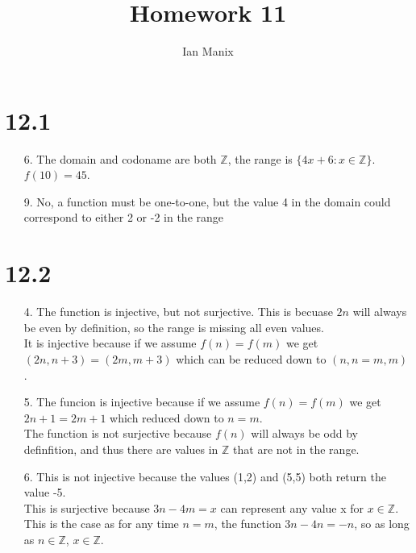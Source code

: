 \documentclass[sigconf]{article}
\title{
  \textbf{Homework 11} \\
  }
\author{ 
  Ian Manix
  }
\begin{document}



\maketitle




\section*{12.1}
\begin{itemize}
  \item[6.] The domain and codoname are both $\mathbb{Z}$, the range is $\{4x+6:x\in\mathbb{Z}\}$. $f(10)=45$.
  \item[9.] No, a function must be one-to-one, but the value 4 in the domain could correspond to either 2 or -2 in the range
\end{itemize}

\section*{12.2}
\begin{itemize}
  \item[4.] The function is injective, but not surjective. This is becuase $2n$ will always be even by definition, so the range is missing all even values.\\
            It is injective because if we assume $f(n)=f(m)$ we get $(2n,n+3)=(2m,m+3)$ which can be reduced down to $(n,n=m,m)$.
  \item[5.] The funcion is injective because if we assume $f(n)=f(m)$ we get $2n+1=2m+1$ which reduced down to $n=m$.\\
            The function is not surjective because $f(n)$ will always be odd by definfition, and thus there are values in $\mathbb{Z}$ that are not in the range.
  \item[6.] This is not injective because the values (1,2) and (5,5) both return the value -5.\\
            This is surjective because $3n-4m=x$ can represent any value x for $x\in\mathbb{Z}$. This is the case as for any time $n=m$, the function $3n-4n=-n$, so as long as $n\in\mathbb{Z}$, $x\in\mathbb{Z}$.
\end{itemize}
\end{document}
